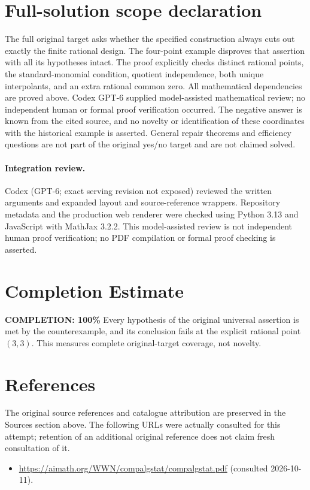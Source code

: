 \documentclass[11pt]{article}
\begin{document}
\section{Full-solution scope declaration}
The full original target asks whether the specified construction always cuts out
exactly the finite rational design. The four-point example disproves that assertion
with all its hypotheses intact. The proof explicitly checks distinct rational
points, the standard-monomial condition, quotient independence, both unique
interpolants, and an extra rational common zero. All mathematical dependencies
are proved above. Codex GPT-6 supplied model-assisted mathematical review; no
independent human or formal proof verification occurred. The negative answer is
known from the cited source, and no novelty or identification of these coordinates
with the historical example is asserted. General repair theorems and efficiency
questions are not part of the original yes/no target and are not claimed solved.
\paragraph{Integration review.} Codex (GPT-6; exact serving revision not exposed) reviewed the written arguments and expanded layout and source-reference wrappers. Repository metadata and the production web renderer were checked using Python 3.13 and JavaScript with MathJax 3.2.2. This model-assisted review is not independent human proof verification; no PDF compilation or formal proof checking is asserted.

\section{Completion Estimate}
\noindent\textbf{COMPLETION: 100\%}
Every hypothesis of the original universal assertion is met by the counterexample,
and its conclusion fails at the explicit rational point $(3,3)$. This measures
complete original-target coverage, not novelty.
\section{References}
The original source references and catalogue attribution are preserved in the
Sources section above. The following URLs were actually consulted for this attempt;
retention of an additional original reference does not claim fresh consultation of it.
\begin{itemize}
\item \url{https://aimath.org/WWN/compalgstat/compalgstat.pdf} (consulted 2026-10-11). 
\end{itemize}
\end{document}
